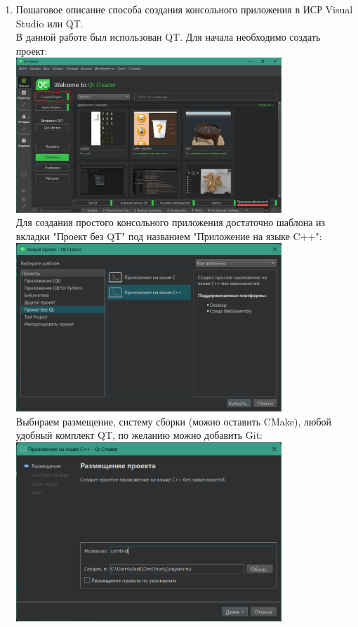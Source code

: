 \documentclass[a4paper,14pt]{extarticle}
\begin{document}
\begin{enumerate}[1.]
    \item Пошаговое описание способа создания консольного приложения в ИСР
    Visual Studio или QT.\\
    В данной работе был использован QT. Для начала необходимо создать проект:\\
    \includegraphics[width=100mm]{qtS1}\\
    Для создания простого консольного приложения достаточно шаблона из вкладки "Проект без QT" под названием "Приложение на языке C++":\\
    \includegraphics[width=100mm]{qtS2}\\
    Выбираем размещение, систему сборки (можно оставить CMake), любой удобный комплект QT, по желанию можно добавить Git:\\
    \includegraphics[width=100mm]{qtS3}\\

\end{enumerate}
\end{document}

